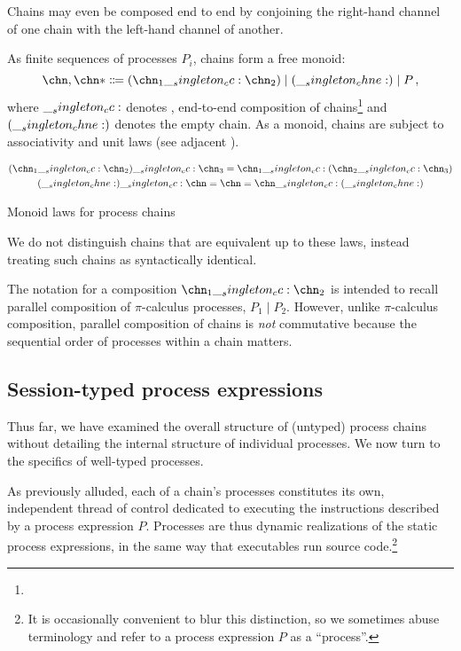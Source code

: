 Chains may even be composed end to end by conjoining the right-hand channel of one chain with the left-hand channel of another.

As finite sequences of processes $P_i$, chains form a free monoid:
\begin{equation*}
  \chn,\chn* \Coloneqq (\chn_1 \cc \chn_2) \mid (\chne) \mid P
  \,,
\end{equation*}
where $\__singleton_cc:$ denotes , end-to-end composition of chains\footnote{} and $(\__singleton_chne:)$ denotes the empty chain.
As a monoid, chains are subject to associativity and unit laws (see adjacent ).
\begin{marginfigure}
\begin{gather*}
  (\chn_1 \cc \chn_2) \cc \chn_3 = \chn_1 \cc (\chn_2 \cc \chn_3) \\
  (\chne) \cc \chn = \chn = \chn \cc (\chne)
\end{gather*}
\caption{Monoid laws for process chains}\label{fig:chains:monoid-laws}
\end{marginfigure}
We do not distinguish chains that are equivalent up to these laws, instead treating such chains as syntactically identical.

The notation for a composition $\chn_1 \cc \chn_2$ is intended to recall parallel composition of $\pi$-calculus processes, $P_1 \mid P_2$.
However, unlike $\pi$-calculus composition, parallel composition of chains is \emph{not} commutative because the sequential order of processes within a chain matters.


\subsection{Session-typed process expressions}\label{sec:process-chains:typed-processes}

Thus far, we have examined the overall structure of (untyped) process chains without detailing the internal structure of individual processes.
We now turn to the specifics of well-typed processes.

As previously alluded, each of a chain's processes constitutes its own, independent thread of control dedicated to executing the instructions described by a process expression $P$.
Processes are thus dynamic realizations of the static process expressions, in the same way that executables run source code.\footnote{It is occasionally convenient to blur this distinction, so we sometimes abuse terminology and refer to a process expression $P$ as a \enquote{process}.}

